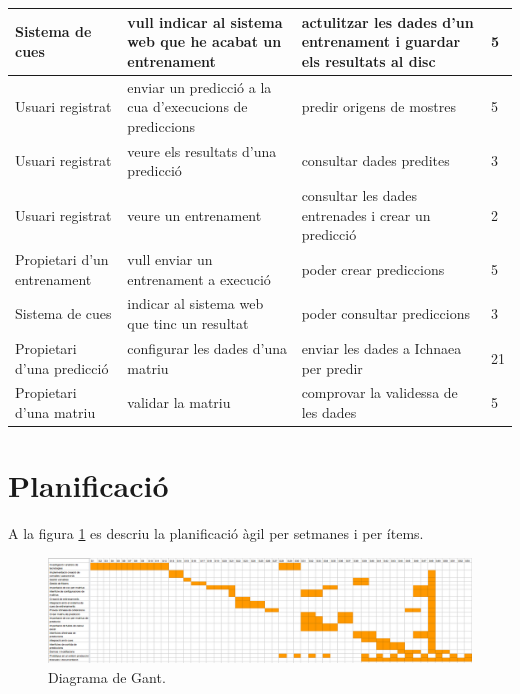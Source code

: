 \begin{center}
\begin{longtable}{ | p{3cm} | p{5cm} | p{5cm} | p{1cm} | }
Sistema de cues & vull indicar al sistema web que he acabat un entrenament & actulitzar les dades d'un entrenament i guardar els resultats al disc & 5 \\ \hline
Usuari registrat & enviar un predicció a la cua d'execucions de prediccions & predir origens de mostres & 5  \\ \hline
Usuari registrat & veure els resultats d'una predicció & consultar dades predites & 3  \\ \hline
Usuari registrat & veure un entrenament & consultar les dades entrenades i crear un predicció & 2  \\ \hline
Propietari d'un entrenament & vull enviar un entrenament a execució & poder crear prediccions & 5  \\ \hline
Sistema de cues & indicar al sistema web que tinc un resultat & poder consultar prediccions & 3  \\ \hline
Propietari d'una predicció & configurar les dades d'una matriu	& enviar les dades a Ichnaea per predir & 21  \\ \hline
Propietari d'una matriu & validar la matriu	 & comprovar la validessa de les dades & 5  \\ \hline
\end{longtable}
\end{center}

\section{Planificació}
A la figura \ref{fig:gant} es descriu la planificació àgil per setmanes i per ítems.
\begin{figure}
    \includegraphics[scale=0.5]{img/conclussions/gantz.png}
    \caption{Diagrama de Gant.}
    \label{fig:gant}
\end{figure}

